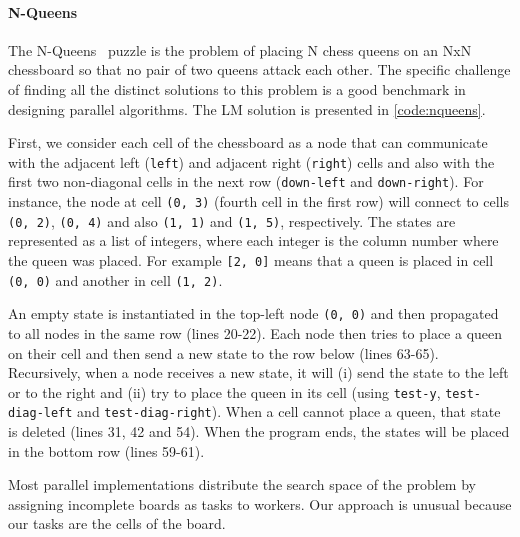 
\paragraph{N-Queens}

The N-Queens~\cite{8queens} puzzle is the problem of placing N chess queens on an NxN chessboard so
that no pair of two queens attack each other. The specific challenge of finding all the distinct
solutions to this problem is a good benchmark in designing parallel algorithms. The LM solution is presented
in \ref{code:nqueens}.

First, we consider each cell of the chessboard as a node that can communicate with the adjacent left
(\texttt{left}) and adjacent right (\texttt{right}) cells and also with the first two non-diagonal cells in the next row
(\texttt{down-left} and \texttt{down-right}). For instance, the node at cell \texttt{(0,~3)} (fourth cell in the first row) will connect
to cells \texttt{(0,~2)}, \texttt{(0,~4)} and also \texttt{(1,~1)} and \texttt{(1,~5)}, respectively. The states are represented as a list
of integers, where each integer is the column number where the queen was placed. For example \texttt{[2, 0]}
means that a queen is placed in cell \texttt{(0,~0)} and another in cell \texttt{(1,~2)}.

An empty state is instantiated in the top-left node \texttt{(0,~0)} and then propagated to all nodes in the same row (lines 20-22).
Each node then tries to place a queen on their cell and then send a new state to the row below (lines 63-65).
Recursively, when a node receives a new state, it will (i) send the state to the left
or to the right and (ii) try to place the queen in its cell (using \texttt{test-y}, \texttt{test-diag-left} and \texttt{test-diag-right}). When a cell cannot place a queen, that state is deleted (lines 31, 42 and 54).
When the program ends, the states will be placed in the bottom row (lines 59-61).

Most parallel implementations distribute the search space of the problem by assigning incomplete boards as tasks to workers.
Our approach is unusual because our tasks are the cells of the board.

\vspace{-4mm}